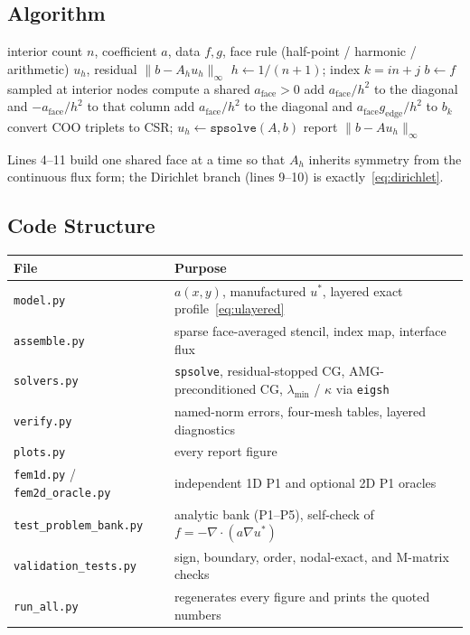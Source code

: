 \documentclass[11pt,a4paper]{article}
\begin{document}
\subsection{Algorithm}
\begin{algorithm}[H]
\caption{Assembly of \(A_h U=b\) and the direct solve}
\begin{algorithmic}[1]
\Require interior count \(n\), coefficient \(a\), data \(f,g\), face rule (half-point / harmonic / arithmetic)
\Ensure \(u_h\), residual \(\|b-A_h u_h\|_\infty\)
\State \(h\leftarrow 1/(n+1)\); index \(k=in+j\)
\State \(b\leftarrow f\) sampled at interior nodes
    \State compute a shared \(a_{\mathrm{face}}>0\)
      \State add \(a_{\mathrm{face}}/h^2\) to the diagonal and \(-a_{\mathrm{face}}/h^2\) to that column
    \Else
      \State add \(a_{\mathrm{face}}/h^2\) to the diagonal and \(a_{\mathrm{face}} g_{\mathrm{edge}}/h^2\) to \(b_k\)
    \EndIf
  \EndFor
\EndFor
\State convert COO triplets to CSR; \(u_h\leftarrow\texttt{spsolve}(A,b)\)
\State report \(\|b-A u_h\|_\infty\)
\end{algorithmic}
\end{algorithm}
\noindent
Lines 4--11 build one shared face at a time so that \(A_h\) inherits symmetry from the continuous flux form; the Dirichlet branch (lines 9--10) is exactly~\eqref{eq:dirichlet}.

\subsection{Code Structure}
\begin{center}
\begin{tabular}{@{}lp{}@{}}
\toprule
File & Purpose\\
\midrule
\texttt{model.py} & \(a(x,y)\), manufactured \(u^*\), layered exact profile~\eqref{eq:ulayered}\\
\texttt{assemble.py} & sparse face-averaged stencil, index map, interface flux\\
\texttt{solvers.py} & \texttt{spsolve}, residual-stopped CG, AMG-preconditioned CG, \(\lambda_{\min}\) / \(\kappa\) via \texttt{eigsh}\\
\texttt{verify.py} & named-norm errors, four-mesh tables, layered diagnostics\\
\texttt{plots.py} & every report figure\\
\texttt{fem1d.py} / \texttt{fem2d\_oracle.py} & independent 1D P1 and optional 2D P1 oracles\\
\texttt{test\_problem\_bank.py} & analytic bank (P1--P5), self-check of \(f=-\nabla\cdot(a\nabla u^*)\)\\
\texttt{validation\_tests.py} & sign, boundary, order, nodal-exact, and M-matrix checks\\
\texttt{run\_all.py} & regenerates every figure and prints the quoted numbers\\
\bottomrule
\end{tabular}
\end{center}
\end{document}
